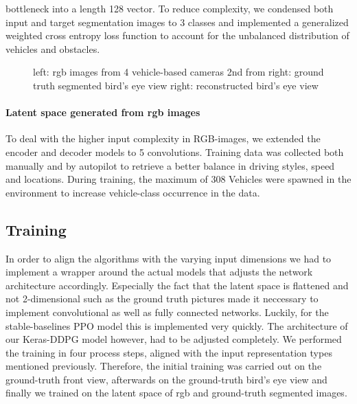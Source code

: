 \documentclass[letterpaper, 10 pt, conference]{ieeeconf}  %
\begin{document}
bottleneck into a length 128 vector. To reduce complexity, we condensed both input and target segmentation images to 3 classes 
and implemented a generalized weighted cross entropy\cite{zhangGeneralizedCrossEntropy2018} loss function to 
account for the unbalanced distribution of vehicles and obstacles.
\begin{figure}[thpb]
   \centering
   \caption{left: rgb images from 4 vehicle-based cameras
            \newline 2nd from right: ground truth segmented bird's eye view
            \newline right: reconstructed bird's eye view}
       \label{figurelabel} 
       \end{figure}

\paragraph{Latent space generated from rgb images} To deal with the higher input complexity in RGB-images, we extended the
encoder and decoder models to 5 convolutions. Training data was collected both manually and by autopilot to retrieve a better 
balance in driving styles, speed and locations. During training, the maximum of 308 Vehicles were spawned in the environment to 
increase vehicle-class occurrence in the data. 
       
\subsection{Training}
In order to align the algorithms with the varying input dimensions we had to implement a wrapper 
around the actual models that adjusts the network architecture accordingly. Especially the fact that 
the latent space is flattened and not 2-dimensional such as the ground truth pictures made it 
neccessary to implement convolutional as well as  fully connected networks. 
Luckily, for the stable-baselines PPO model this is implemented very quickly. 
The architecture of our Keras-DDPG model however, had to be adjusted completely. 
We performed the training in four process steps, aligned with the input representation 
types mentioned previously. Therefore, the initial training was carried out on the ground-truth 
front view, afterwards on the ground-truth bird's eye view and finally we trained on the latent 
space of rgb and ground-truth segmented images. 
\end{document}
